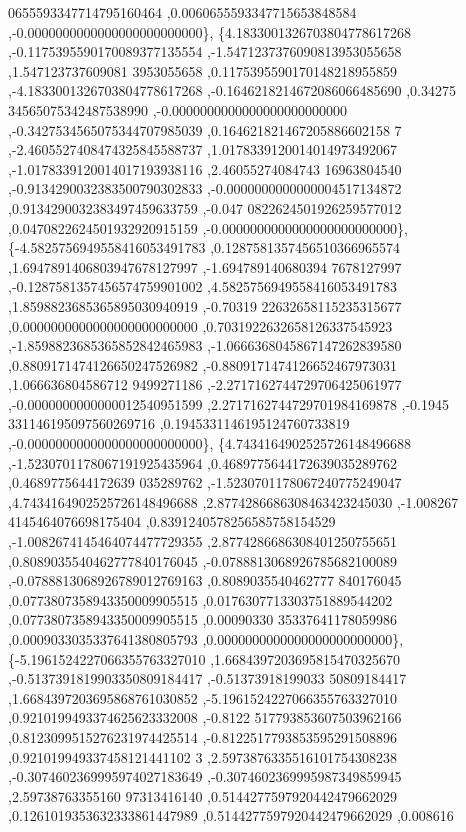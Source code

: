 \begin{DoxyCode}
      0655593347714795160464 ,0.0060655593347715653848584 ,-0.0000000000000000000000000\},
\{4.1833001326703804778617268 ,-0.1175395590170089377135554 ,-1.5471237376090813953055658 ,1.547123737609081
      3953055658 ,0.1175395590170148218955859 ,-4.1833001326703804778617268 ,-0.1646218214672086066485690 ,0.34275
      34565075342487538990 ,-0.0000000000000000000000000 ,-0.3427534565075344707985039 ,0.164621821467205886602158
      7 ,-2.4605527408474325845588737 ,1.0178339120014014973492067 ,-1.0178339120014017193938116 ,2.46055274084743
      16963804540 ,-0.9134290032383500790302833 ,-0.0000000000000004517134872 ,0.9134290032383497459633759 ,-0.047
      0822624501926259577012 ,0.0470822624501932920915159 ,-0.0000000000000000000000000\},
\{-4.5825756949558416053491783 ,0.1287581357456510366965574 ,1.6947891406803947678127997 ,-1.694789140680394
      7678127997 ,-0.1287581357456574759901002 ,4.5825756949558416053491783 ,1.8598823685365895030940919 ,-0.70319
      22632658115235315677 ,0.0000000000000000000000000 ,0.7031922632658126337545923 ,-1.8598823685365852842465983
       ,-1.0666368045867147262839580 ,0.8809171474126650247526982 ,-0.8809171474126652467973031 ,1.066636804586712
      9499271186 ,-2.2717162744729706425061977 ,-0.0000000000000012540951599 ,2.2717162744729701984169878 ,-0.1945
      331146195097560269716 ,0.1945331146195124760733819 ,-0.0000000000000000000000000\},
\{4.7434164902525726148496688 ,-1.5230701178067191925435964 ,0.4689775644172639035289762 ,0.4689775644172639
      035289762 ,-1.5230701178067240775249047 ,4.7434164902525726148496688 ,2.8774286686308463423245030 ,-1.008267
      4145464076698175404 ,0.8391240578256585758154529 ,-1.0082674145464074477729355 ,2.8774286686308401250755651 
      ,0.8089035540462777840176045 ,-0.0788813068926785682100089 ,-0.0788813068926789012769163 ,0.8089035540462777
      840176045 ,0.0773807358943350009905515 ,0.0176307713303751889544202 ,0.0773807358943350009905515 ,0.00090330
      35337641178059986 ,0.0009033035337641380805793 ,0.0000000000000000000000000\},
\{-5.1961524227066355763327010 ,1.6684397203695815470325670 ,-0.5137391819903350809184417 ,-0.51373918199033
      50809184417 ,1.6684397203695868761030852 ,-5.1961524227066355763327010 ,0.9210199493374625623332008 ,-0.8122
      517793853607503962166 ,0.8123099515276231974425514 ,-0.8122517793853595291508896 ,0.921019949337458121441102
      3 ,2.5973876335516101754308238 ,-0.3074602369995974027183649 ,-0.3074602369995987349859945 ,2.59738763355160
      97313416140 ,0.5144277597920442479662029 ,0.1261019353632333861447989 ,0.5144277597920442479662029 ,0.008616

\end{DoxyCode}
